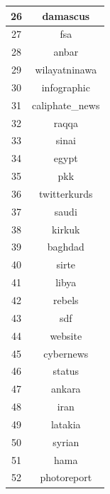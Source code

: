 \documentclass[conference]{IEEEtran}
\begin{document}
\begin{table}[ht]
\begin{tabular} { | c | c | }
            \hline
            26   & damascus       \\
            \hline
            27   & fsa            \\
            \hline
            28   & anbar          \\
            \hline
            29   & wilayatninawa  \\
            \hline
            30   & infographic    \\
            \hline
            31   & caliphate\_news \\
            \hline
            32   & raqqa          \\
            \hline
            33   & sinai          \\
            \hline
            34   & egypt          \\
            \hline
            35   & pkk            \\
            \hline
            36   & twitterkurds   \\
            \hline
            37   & saudi          \\
            \hline
            38   & kirkuk         \\
            \hline
            39   & baghdad        \\
            \hline
            40   & sirte          \\
            \hline
            41   & libya          \\
            \hline
            42   & rebels         \\
            \hline
            43   & sdf            \\
            \hline
            44   & website        \\
            \hline
            45   & cybernews      \\
            \hline
            46   & status         \\
            \hline
            47   & ankara         \\
            \hline
            48   & iran           \\
            \hline
            49   & latakia        \\
            \hline
            50   & syrian         \\
            \hline
            51   & hama           \\
            \hline
            52   & photoreport    \\
            \hline

\end{tabular}
\end{table}
\end{document}

